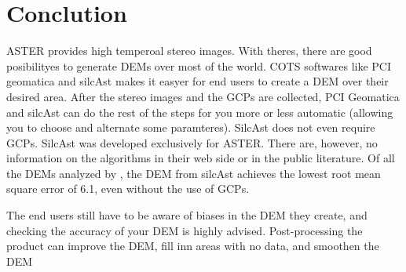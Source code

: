 \documentclass[a4paper,UKenglish]{article}
\begin{document}
\section{Conclution}

ASTER provides high temperoal stereo images. With theres, there are good posibilityes to generate DEMs over most of the world. COTS softwares like PCI geomatica and silcAst makes it easyer for end users to create a DEM over their desired area. After the stereo images and the GCPs are collected, PCI Geomatica and silcAst can do the rest of the steps for you more or less automatic (allowing you to choose and alternate some paramteres). SilcAst does not even require GCPs. SilcAst was developed exclusively for ASTER. There are, however,  no information on the algorithms in their web side or in the public literature. Of all the DEMs analyzed by \cite{toutin08}, the DEM from silcAst achieves the lowest root mean square error of 6.1, even without the use of GCPs.

The end users still have to be aware of biases in the DEM they create, and checking the accuracy of your DEM is highly advised. Post-processing the product can improve the DEM, fill inn areas with no data, and smoothen the DEM



\end{document}

